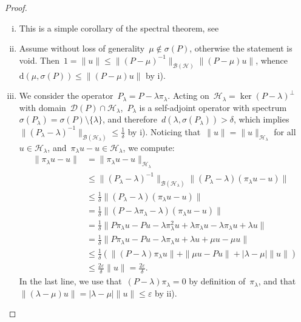 \documentclass[10pt]{article}
\newcommand{\1}{\mathbbm 1}
\begin{document}
    \begin{proof}
        \begin{enumerate}[i)]
            \item {This is a simple corollary of the spectral theorem, see}
            \item {Assume without loss of generality~$\mu\not\in\sigma(P)$, otherwise the statement is void. Then~$1 = \|u\| \leq \|(P-\mu)^{-1}\|_{\mathcal B(\mathcal H)} \|(P-\mu)u\|$, whence~$\mathrm{d}(\mu,\sigma(P))\leq \| (P-\mu)u\|$ by i).}
            \item {We consider the operator~$P_\lambda = P - \lambda\pi_\lambda$. Acting on~$\mathcal H_\lambda=\ker (P-\lambda)^{\perp}$ with domain~$\mathcal D(P)\cap \mathcal H_\lambda$,~$P_\lambda$ is a self-adjoint operator with spectrum~$\sigma(P_\lambda) = \sigma(P)\setminus \{\lambda\}$, and therefore~$d(\lambda,\sigma(P_\lambda)) > \delta$, which implies~$\|(P_\lambda-\lambda)^{-1}\|_{\mathcal B(\mathcal H_\lambda)} \leq \frac1\delta$ by i).
            Noticing that~$\|u\| = \|u\|_{\mathcal H_\lambda}$ for all~$u\in \mathcal H_\lambda$, and~$\pi_\lambda u - u\in \mathcal H_\lambda$, we compute:
            \begin{align*}
               \|\pi_\lambda u -u\| &= \|\pi_\lambda u -u\|_{\mathcal H_\lambda}\\
                &\leq \|(P_\lambda - \lambda)^{-1}\|_{\mathcal B(\mathcal H_\lambda)}\|(P_\lambda - \lambda)(\pi_\lambda u -u)\|\\
                &\leq \frac1\delta\|(P_\lambda - \lambda)(\pi_\lambda u -u) \|\\
                &=\frac1\delta\|(P-\lambda\pi_\lambda-\lambda)(\pi_\lambda u -u)\|\\
                &=\frac1\delta\|P\pi_\lambda u -Pu -\lambda\pi_\lambda^2 u + \lambda\pi_\lambda u -\lambda \pi_\lambda u +\lambda u\|\\
                 &= \frac1\delta \| P\pi_\lambda u - Pu - \lambda\pi_\lambda u + \lambda u + \mu u  - \mu u\|\\
                 &\leq \frac1\delta\left(\|(P-\lambda)\pi_\lambda u\| + \|\mu u - Pu\| + |\lambda - \mu|\|u\|\right)\\
                 &\leq \frac{2\varepsilon}\delta\|u\| = \frac{2\varepsilon}{\delta}.
            \end{align*}
            In the last line, we use that~$(P-\lambda)\pi_\lambda = 0$ by definition of~$\pi_\lambda$, and that~$\|(\lambda -\mu)u\| = |\lambda-\mu|\|u\|\leq \varepsilon$ by ii).
}
\end{enumerate}
\end{proof}
\end{document}
